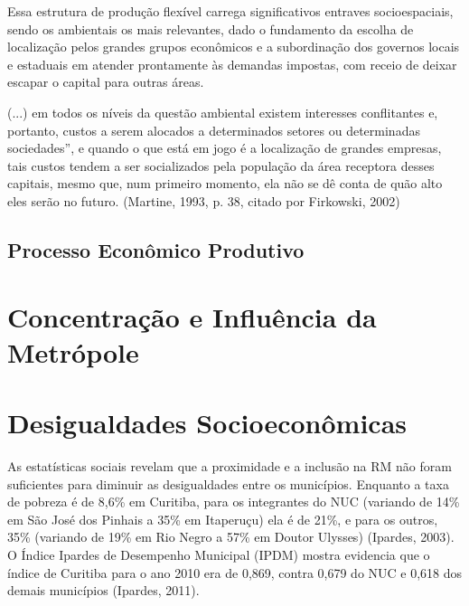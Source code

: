 	Essa estrutura de produção flexível carrega significativos entraves socioespaciais, sendo os ambientais os mais relevantes, dado o fundamento da escolha de localização pelos grandes grupos econômicos e a subordinação dos governos locais e estaduais em atender prontamente às demandas impostas, com receio de deixar escapar o capital para outras áreas.
	
	\begin{citacao}
		(...) em todos os níveis da questão ambiental existem interesses conflitantes e, portanto, custos a serem alocados a determinados setores ou determinadas sociedades”, e quando o que está em jogo é a localização de grandes empresas, tais custos tendem a ser socializados pela população da área receptora desses capitais, mesmo que, num primeiro momento, ela não se dê conta de quão alto eles serão no futuro. (Martine, 1993, p. 38, citado por Firkowski, 2002) 
	\end{citacao}

	\subsection{Processo Econômico Produtivo}
	
	\section{Concentração e Influência da Metrópole}
	
	\section{Desigualdades Socioeconômicas}
	
	As estatísticas sociais revelam que a proximidade e a inclusão na RM não foram suficientes para diminuir as desigualdades entre os municípios. Enquanto a taxa de pobreza é de 8,6\% em Curitiba, para os integrantes do NUC (variando de 14\% em São José dos Pinhais a 35\% em Itaperuçu) ela é de 21\%, e para os outros, 35\% (variando de 19\% em Rio Negro a 57\% em Doutor Ulysses) (Ipardes, 2003). O Índice Ipardes de Desempenho Municipal (IPDM) mostra evidencia que o índice de Curitiba para o ano 2010 era de 0,869, contra 0,679 do NUC e 0,618 dos demais municípios (Ipardes, 2011). 

